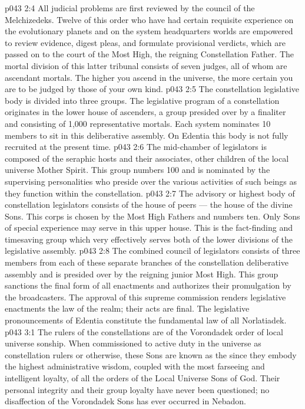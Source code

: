 \vs p043 2:4 All judicial problems are first reviewed by the council of the Melchizedeks. Twelve of this order who have had certain requisite experience on the evolutionary planets and on the system headquarters worlds are empowered to review evidence, digest pleas, and formulate provisional verdicts, which are passed on to the court of the Most High, the reigning Constellation Father. The mortal division of this latter tribunal consists of seven judges, all of whom are ascendant mortals. The higher you ascend in the universe, the more certain you are to be judged by those of your own kind.
\vs p043 2:5 \pc The constellation legislative body is divided into three groups. The legislative program of a constellation originates in the lower house of ascenders, a group presided over by a finaliter and consisting of 1,000 representative mortals. Each system nominates 10 members to sit in this deliberative assembly. On Edentia this body is not fully recruited at the present time.
\vs p043 2:6 The mid\hyp{}chamber of legislators is composed of the seraphic hosts and their associates, other children of the local universe Mother Spirit. This group numbers 100 and is nominated by the supervising personalities who preside over the various activities of such beings as they function within the constellation.
\vs p043 2:7 The advisory or highest body of constellation legislators consists of the house of peers --- the house of the divine Sons. This corps is chosen by the Most High Fathers and numbers ten. Only Sons of special experience may serve in this upper house. This is the fact\hyp{}finding and timesaving group which very effectively serves both of the lower divisions of the legislative assembly.
\vs p043 2:8 The combined council of legislators consists of three members from each of these separate branches of the constellation deliberative assembly and is presided over by the reigning junior Most High. This group sanctions the final form of all enactments and authorizes their promulgation by the broadcasters. The approval of this supreme commission renders legislative enactments the law of the realm; their acts are final. The legislative pronouncements of Edentia constitute the fundamental law of all Norlatiadek.
\vs p043 3:1 The rulers of the constellations are of the Vorondadek order of local universe sonship. When commissioned to active duty in the universe as constellation rulers or otherwise, these Sons are known as the  since they embody the highest administrative wisdom, coupled with the most farseeing and intelligent loyalty, of all the orders of the Local Universe Sons of God. Their personal integrity and their group loyalty have never been questioned; no disaffection of the Vorondadek Sons has ever occurred in Nebadon.
